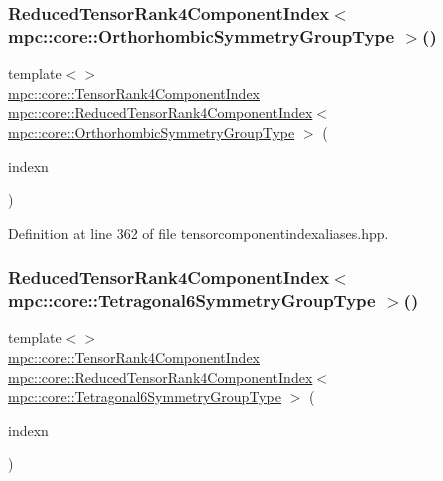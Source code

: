 \subsubsection{\texorpdfstring{Reduced\+Tensor\+Rank4\+Component\+Index$<$ mpc\+::core\+::\+Orthorhombic\+Symmetry\+Group\+Type $>$()}{ReducedTensorRank4ComponentIndex< mpc::core::OrthorhombicSymmetryGroupType >()}}
{\footnotesize\ttfamily template$<$$>$ \\
\mbox{\hyperlink{namespacempc_1_1core_a54c081f41b2475abd10182bf023805d2}{mpc\+::core\+::\+Tensor\+Rank4\+Component\+Index}} \mbox{\hyperlink{namespacempc_1_1core_ae67b259d682419c12fa2e072049d20ad}{mpc\+::core\+::\+Reduced\+Tensor\+Rank4\+Component\+Index}}$<$ \mbox{\hyperlink{structmpc_1_1core_1_1_orthorhombic_symmetry_group_type}{mpc\+::core\+::\+Orthorhombic\+Symmetry\+Group\+Type}} $>$ (\begin{DoxyParamCaption}\item[{const \mbox{\hyperlink{namespacempc_1_1core_a54c081f41b2475abd10182bf023805d2}{mpc\+::core\+::\+Tensor\+Rank4\+Component\+Index}} \&}]{indexn }\end{DoxyParamCaption})\hspace{0.3cm}{\ttfamily [inline]}}



Definition at line 362 of file tensorcomponentindexaliases.\+hpp.

\mbox{\label{namespacempc_1_1core_a8d91529fe189cafe00a575b601cf2b20}} 
\subsubsection{\texorpdfstring{Reduced\+Tensor\+Rank4\+Component\+Index$<$ mpc\+::core\+::\+Tetragonal6\+Symmetry\+Group\+Type $>$()}{ReducedTensorRank4ComponentIndex< mpc::core::Tetragonal6SymmetryGroupType >()}}
{\footnotesize\ttfamily template$<$$>$ \\
\mbox{\hyperlink{namespacempc_1_1core_a54c081f41b2475abd10182bf023805d2}{mpc\+::core\+::\+Tensor\+Rank4\+Component\+Index}} \mbox{\hyperlink{namespacempc_1_1core_ae67b259d682419c12fa2e072049d20ad}{mpc\+::core\+::\+Reduced\+Tensor\+Rank4\+Component\+Index}}$<$ \mbox{\hyperlink{structmpc_1_1core_1_1_tetragonal6_symmetry_group_type}{mpc\+::core\+::\+Tetragonal6\+Symmetry\+Group\+Type}} $>$ (\begin{DoxyParamCaption}\item[{const \mbox{\hyperlink{namespacempc_1_1core_a54c081f41b2475abd10182bf023805d2}{mpc\+::core\+::\+Tensor\+Rank4\+Component\+Index}} \&}]{indexn }\end{DoxyParamCaption})\hspace{0.3cm}{\ttfamily [inline]}}



